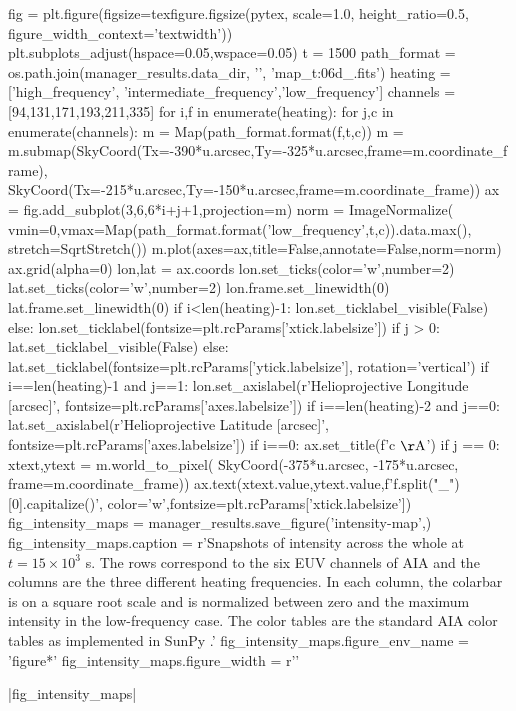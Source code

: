 \begin{pycode}
fig = plt.figure(figsize=texfigure.figsize(pytex, scale=1.0, height_ratio=0.5, 
                                           figure_width_context='textwidth'))
plt.subplots_adjust(hspace=0.05,wspace=0.05)
t = 1500
path_format = os.path.join(manager_results.data_dir, '{}', 'map_t{:06d}_{}.fits')
heating = ['high_frequency', 'intermediate_frequency','low_frequency']
channels = [94,131,171,193,211,335]
for i,f in enumerate(heating):
    for j,c in enumerate(channels):
        m = Map(path_format.format(f,t,c))
        m = m.submap(SkyCoord(Tx=-390*u.arcsec,Ty=-325*u.arcsec,frame=m.coordinate_frame),
                     SkyCoord(Tx=-215*u.arcsec,Ty=-150*u.arcsec,frame=m.coordinate_frame))
        ax = fig.add_subplot(3,6,6*i+j+1,projection=m)
        norm = ImageNormalize(
            vmin=0,vmax=Map(path_format.format('low_frequency',t,c)).data.max(),
            stretch=SqrtStretch())
        m.plot(axes=ax,title=False,annotate=False,norm=norm)
        ax.grid(alpha=0)
        lon,lat = ax.coords
        lon.set_ticks(color='w',number=2)
        lat.set_ticks(color='w',number=2)
        lon.frame.set_linewidth(0)
        lat.frame.set_linewidth(0)
        if i<len(heating)-1:
            lon.set_ticklabel_visible(False)
        else:
            lon.set_ticklabel(fontsize=plt.rcParams['xtick.labelsize'])
        if j > 0:
            lat.set_ticklabel_visible(False)
        else:
            lat.set_ticklabel(fontsize=plt.rcParams['ytick.labelsize'], rotation='vertical')
        if i==len(heating)-1 and j==1:
            lon.set_axislabel(r'Helioprojective Longitude [arcsec]',
                                fontsize=plt.rcParams['axes.labelsize'])
        if i==len(heating)-2 and j==0:
            lat.set_axislabel(r'Helioprojective Latitude [arcsec]',
                                fontsize=plt.rcParams['axes.labelsize'])
        if i==0:
            ax.set_title(f'{c} $\mathrm{{\AA}}$')
        if j == 0:
            xtext,ytext = m.world_to_pixel(
                SkyCoord(-375*u.arcsec, -175*u.arcsec, frame=m.coordinate_frame))
            ax.text(xtext.value,ytext.value,f'{f.split("_")[0].capitalize()}',
                    color='w',fontsize=plt.rcParams['xtick.labelsize'])
fig_intensity_maps = manager_results.save_figure('intensity-map',)
fig_intensity_maps.caption = r'Snapshots of intensity across the whole \AR{} at $t=15\times10^3$ s. The rows correspond to the six EUV channels of AIA and the columns are the three different heating frequencies. In each column, the colarbar is on a square root scale and is normalized between zero and the maximum intensity in the low-frequency case. The color tables are the standard AIA color tables as implemented in SunPy \citep{sunpy_community_sunpypython_2015}.'
fig_intensity_maps.figure_env_name = 'figure*'
fig_intensity_maps.figure_width = r'\textwidth'
\end{pycode}
|fig_intensity_maps|

